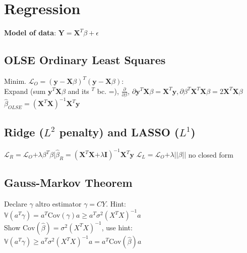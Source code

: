 \section*{Regression}
\textbf{Model of data}:
$\mathbf{Y}=\mathbf{X}^T\beta +\epsilon$

\subsection*{OLSE Ordinary Least Squares}
Minim.
$\mathcal{L}_O = (\mathbf{y}-\mathbf{X}\beta)^T(\mathbf{y}-\mathbf{X}\beta)$:\\
Expand (sum $\mathbf{y}^T\mathbf{X}\beta$ and its $^T$ bc. =), $\frac{\partial}{\partial\beta}$, $\partial\mathbf{y}^T\mathbf{X}\beta=\mathbf{X}^T\mathbf{y}, \partial\beta^T\textbf{X}^T\textbf{X}\beta=2\textbf{X}^T\textbf{X}\beta$ \\
$\hat\beta_{OLSE}=(\textbf{X}^T\textbf{X})^{-1}\textbf{X}^T\textbf{y}$


\subsection*{Ridge ($L^2$ penalty) and LASSO ($L^1$)}
$\mathcal{L}_R\mathrm{=}\mathcal{L}_O\mathrm{+}\lambda\beta^T\beta\mathrm{|}\hat\beta_{R}\mathrm{=}(\textbf{X}^T\textbf{X}\mathrm{+}\lambda\textbf{I})^{-1}\textbf{X}^T\textbf{y}$
$\mathcal{L}_L\mathrm{=}\mathcal{L}_O\mathrm{+}\lambda||\beta||$ no closed form

\subsection*{Gauss-Markov Theorem}
Declare $\gamma$ altro estimator $\gamma = CY$. Hint:\\
$\mathbb{V}(a^T\gamma)\mathrm{=}a^T\mathrm{Cov}(\gamma)a\mathrm{\geq }a^T\sigma^2(X^TX)^{-1}a$ \\
Show $\mathrm{Cov}(\hat\beta)\mathrm{=}\sigma^2(X^TX)^{-1}$, use hint: \\
$\mathbb{V}(a^T\gamma)\mathrm{\geq }a^T\sigma^2(X^TX)^{-1}a\mathrm{=}a^T\mathrm{Cov}(\hat\beta)a$ \\

